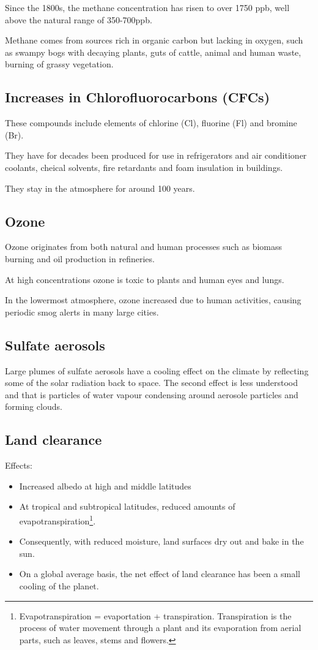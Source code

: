 Since the 1800s, the methane concentration has risen to over 1750 ppb, well
above the natural range of 350-700ppb.

Methane comes from sources rich in organic carbon but lacking in oxygen, such
as swampy bogs with decaying plants, guts of cattle, animal and human waste,
burning of grassy vegetation.

\subsection{Increases in Chlorofluorocarbons (CFCs)}

These compounds include elements of chlorine (Cl), fluorine (Fl) and
bromine (Br).

They have for decades been produced for use in refrigerators and air
conditioner coolants, cheical solvents, fire retardants and foam insulation in
buildings.

They stay in the atmosphere for around 100 years.

\subsection{Ozone}

Ozone originates from both natural and human processes such as biomass burning
and oil production in refineries.

At high concentrations ozone is toxic to plants and human eyes and lungs.

In the lowermost atmosphere, ozone increased due to human activities, causing
periodic smog alerts in many large cities.

\subsection{Sulfate aerosols}

Large plumes of sulfate aerosols have a cooling effect on the climate by
reflecting some of the solar radiation back to space.
The second effect is less understood and that is particles of water vapour
condensing around aerosole particles and forming clouds.

\subsection{Land clearance}

Effects:
\begin{itemize}
	\item Increased albedo at high and middle latitudes
	\item At tropical and subtropical latitudes, reduced amounts of
	evapotranspiration\footnote{
		Evapotranspiration = evaportation + transpiration.
		Transpiration is the process of water movement through a
		plant and its evaporation from aerial parts, such as leaves,
		stems and flowers.
	}.
	\item Consequently, with reduced moisture, land surfaces dry out and
	bake in the sun.
	\item On a global average basis, the net effect of land clearance has
	been a small cooling of the planet.
\end{itemize}


